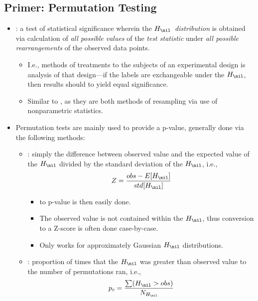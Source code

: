 \begin{itemize}
  \subsection{Primer: Permutation Testing}
  \begin{itemize}
    \item {}: a test of statistical significance wherein the \emph{\(H_\nil\)~distribution} is obtained via calculation of \emph{all possible values} of the \emph{test statistic} under \emph{all possible rearrangements} of the observed data points.
      \begin{itemize}
        \item I.e., methods of treatments to the subjects of an experimental design is analysis of that design---if the labels are exchangeable under the \(H_\nil\), then results should to yield equal significance.
        \item Similar to \hyperref[Subsection: Primer: Cross-Validation]{}, as they are both methods of resampling via use of nonparametric statistics.
      \end{itemize}
    \item Permutation tests are mainly used to provide a p-value, generally done via the following methods:
      \begin{itemize}
        \item {}: simply the difference between observed value and the expected value of the \(H_\nil\) divided by the standard deviation of the \(H_\nil\), i.e.,
        \[%
        Z = \frac{obs - E[H_\nil]}{std[H_\nil]}
        \]%
        \begin{itemize}
          \item \hyperref[Subsection: Degrees of Freedom]{} to p-value is then easily done. 
          \item The observed value is not contained within the \(H_\nil\), thus conversion to a Z-score is often done case-by-case.
          \item Only works for approximately Gaussian \(H_\nil\) distributions.
        \end{itemize}
        \item {}: proportion of times that the \(H_\nil\) was greater than observed value to the number of permutations ran, i.e.,
        \[%
        p_c = \frac{\sum(H_\nil > obs)}{N_{H_\nil}}
\]
\end{itemize}
\end{itemize}
\end{itemize}
